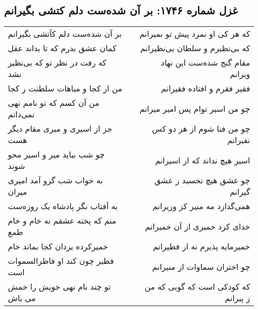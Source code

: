 \begin{center}
\section*{غزل شماره ۱۷۴۶: بر آن شده‌ست دلم کتشی بگیرانم}
\label{sec:1746}
\begin{longtable}{l p{0.5cm} r}
بر آن شده‌ست دلم کآتشی بگیرانم
&&
که هر کی او نمرد پیش تو بمیرانم
\\
کمان عشق بدرم که تا بداند عقل
&&
که بی‌نظیرم و سلطان بی‌نظیرانم
\\
که رفت در نظر تو که بی‌نظیر نشد
&&
مقام گنج شده‌ست این نهاد ویرانم
\\
من از کجا و مباهات سلطنت ز کجا
&&
فقیر فقرم و افتاده فقیرانم
\\
من آن کسم که تو نامم نهی نمی‌دانم
&&
چو من اسیر توام پس امیر میرانم
\\
جز از اسیری و میری مقام دیگر هست
&&
چو من فنا شوم از هر دو کس نفیرانم
\\
چو شب بیاید میر و اسیر محو شوند
&&
اسیر هیچ نداند که از اسیرانم
\\
به خواب شب گرو آمد امیری میران
&&
چو عشق هیچ نخسبد ز عشق گیرانم
\\
به آفتاب نگر پادشاه یک روزه‌ست
&&
همی‌گدازد مه منیر کز وزیرانم
\\
منم که پخته عشقم نه خام و خام طمع
&&
خدای کرد خمیری از آن خمیرانم
\\
خمیرکرده یزدان کجا بماند خام
&&
خمیرمایه پذیرم نه از فطیرانم
\\
فطیر چون کند او فاطرالسموات است
&&
چو اختران سماوات از منیرانم
\\
تو چند نام نهی خویش را خمش می باش
&&
که کودکی است که گویی که من ز پیرانم
\\
\end{longtable}
\end{center}
